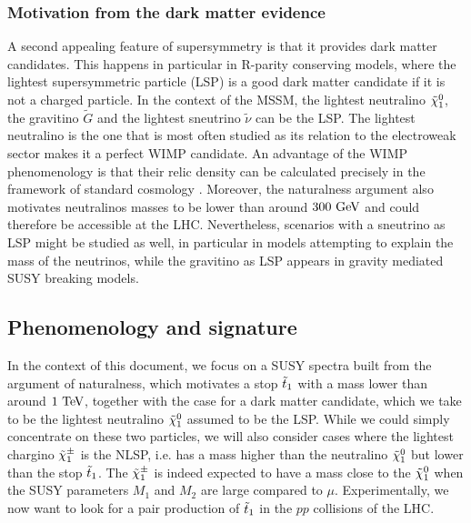         \subsubsection{Motivation from the dark matter evidence}

        A second appealing feature of supersymmetry is that it provides dark matter
        candidates. This happens in particular in R-parity conserving models, where the
        lightest supersymmetric particle (LSP) is a good dark matter candidate if it is
        not a charged particle. In the context of the MSSM, the lightest neutralino
        $\tilde{\chi}_1^0$, the gravitino $\tilde{G}$ and the lightest sneutrino $\tilde{\nu}$
        can be the LSP. The lightest neutralino is the one that is most often studied as its
        relation to the electroweak sector makes it a perfect WIMP candidate.
        An advantage of the WIMP phenomenology is that their relic density can be calculated
        precisely in the framework of standard cosmology \cite{EllisDarkMatter}.
        Moreover, the naturalness argument also motivates neutralinos masses to be lower
        than around $300 ~\text{GeV}$ and could therefore be accessible at the LHC. Nevertheless,
        scenarios with a sneutrino as LSP might be
        studied as well, in particular in models attempting to explain the mass of the
        neutrinos, while the gravitino as LSP appears in gravity mediated SUSY breaking models.

        \subsection{Phenomenology and signature \label{sec:phenoAndSignature}}

        In the context of this document, we focus on a SUSY spectra built from the
        argument of naturalness, which motivates a stop $\tilde{t}_1$ with a mass lower than around
        $1~\text{TeV}$, together with the case for a dark matter candidate, which we take to be the
        lightest neutralino $\tilde{\chi}_1^0$ assumed to be the LSP. While we could simply concentrate on these
        two particles, we will also consider cases where the lightest chargino $\tilde{\chi}_1^\pm$
        is the NLSP, i.e. has a mass higher than the neutralino $\tilde{\chi}_1^0$ but lower
        than the stop $\tilde{t}_1$. The $\tilde{\chi}_1^\pm$ is indeed expected to have a mass close
        to the $\tilde{\chi}_1^0$ when the SUSY parameters $M_1$ and $M_2$
        are large compared to $\mu$. Experimentally, we now want to look for a pair production of
        $\tilde{t}_1$ in the $pp$ collisions of the LHC.

